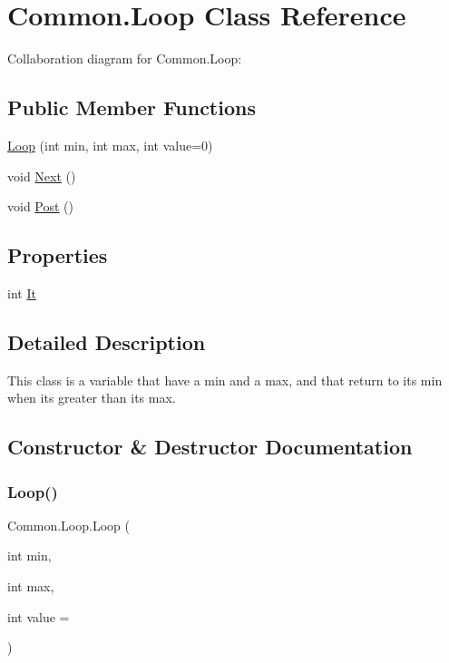 \hypertarget{class_common_1_1_loop}{}\section{Common.\+Loop Class Reference}
\label{class_common_1_1_loop}


Collaboration diagram for Common.\+Loop\+:
\subsection*{Public Member Functions}
\begin{DoxyCompactItemize}
\item 
\hyperlink{class_common_1_1_loop_aa031938b92499084c4d79bdac401de5e}{Loop} (int min, int max, int value=0)
\item 
void \hyperlink{class_common_1_1_loop_a89e95db2c31d2051e3eb49b5f456cb8a}{Next} ()
\item 
void \hyperlink{class_common_1_1_loop_a89f731e95864e90a858a613971e23e86}{Post} ()
\end{DoxyCompactItemize}
\subsection*{Properties}
\begin{DoxyCompactItemize}
\item 
int \hyperlink{class_common_1_1_loop_a248a360b79b01a1f76a314498c7f462f}{It}
\end{DoxyCompactItemize}


\subsection{Detailed Description}
This class is a variable that have a min and a max, and that return to its min when it\textquotesingle{}s greater than its max. 

\subsection{Constructor \& Destructor Documentation}
\mbox{\label{class_common_1_1_loop_aa031938b92499084c4d79bdac401de5e}} 
\subsubsection{\texorpdfstring{Loop()}{Loop()}}
{\footnotesize\ttfamily Common.\+Loop.\+Loop (\begin{DoxyParamCaption}\item[{int}]{min,  }\item[{int}]{max,  }\item[{int}]{value = {} }\end{DoxyParamCaption})\hspace{0.3cm}{\ttfamily [inline]}}

